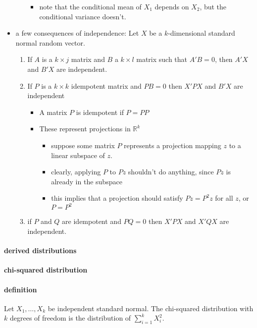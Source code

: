 \begin{itemize}
\begin{itemize}
\begin{itemize}
\item note that the conditional mean of $X_1$ depends on $X_2$, but the conditional variance doesn't.
\end{itemize}
\end{itemize}
\item a few consequences of independence:
        Let $X$ be a $k$-dimensional standard normal random vector.
\begin{enumerate}
\item If $A$ is a $k \times j$ matrix and $B$ a $k \times l$ matrix
           such that $A'B = 0$, then $A'X$ and $B'X$ are independent.
\item If $P$ is a $k\times k$ idempotent matrix and $PB = 0$ then
           $X'PX$ and $B'X$ are independent
\begin{itemize}
\item A matrix $P$ is idempotent if $P = PP$
\item These represent projections in $\mathbb{R}^k$
\begin{itemize}
\item suppose some matrix $P$ represents a projection mapping $z$ to a linear subspace of $z$.
\item clearly, applying $P$ to $Pz$ shouldn't do anything, since $Pz$ is already in the subspace
\item this implies that a projection should satisfy $Pz = P^2 z$ for all $z$, or $P = P^2$
\end{itemize}
\end{itemize}
\item if $P$ and $Q$ are idempotent and $PQ = 0$ then $X'PX$ and
           $X'QX$ are independent.
\end{enumerate}
\end{itemize}

\paragraph{derived distributions}

\paragraph{chi-squared distribution}

\paragraph{definition}
       Let $X_1,\dots,X_k$ be independent standard normal.  The
       chi-squared distribution with $k$ degrees of freedom is the
       distribution of $\sum_{i=1}^k X_i^2$.


